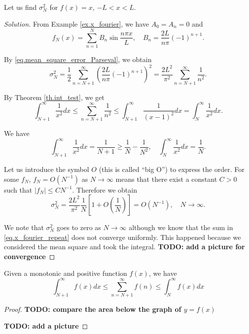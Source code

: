 \begin{example}[]
Let us find $\sigma_N^2$ for $f(x)=x$, $-L<x<L$. 
\end{example}
\begin{proof}[Solution]
From Example \ref{ex.x_fourier}, we have $A_0=A_n=0$ and
\begin{equation}\label{eq.x_fourier_repeat}
    f_N(x)=\sum_{n=1}^N B_n \sin \frac{n \pi x}{L}, \quad B_n=\frac{2 L}{n \pi}(-1)^{n+1} .
\end{equation}

By \eqref{eq.mean_square_error_Parseval}, we obtain
$$
\sigma_N^2=\frac{1}{2} \sum_{n=N+1}^{\infty}\left(\frac{2 L}{n \pi}(-1)^{n+1}\right)^2=\frac{2 L^2}{\pi^2} \sum_{n=N+1}^{\infty} \frac{1}{n^2} .
$$

By Theorem \ref{th.int_test}, we get
$$
\int_{N+1}^{\infty} \frac{1}{x^2} d x \leq \sum_{n=N+1}^{\infty} \frac{1}{n^2} \leq \int_{N+1}^{\infty} \frac{1}{(x-1)^2} d x=\int_N^{\infty} \frac{1}{x^2} d x .
$$

We have
$$
\int_{N+1}^{\infty} \frac{1}{x^2} d x=\frac{1}{N+1} \ge \frac{1}{N} - \frac{1}{N^2}, \quad \int_N^{\infty} \frac{1}{x^2} d x=\frac{1}{N} .
$$

Let us introduce the symbol $O$ (this is called ``big O'') to express the order. For some $f_N$, $f_N=O\left(N^{-1}\right)$ as $N \rightarrow \infty$ means that there exist a constant $C>0$ such that $\left|f_N\right| \leq C N^{-1}$. Therefore we obtain
\begin{equation}\label{eq.x_fourier_mse_converge}
    \sigma_N^2=\frac{2 L^2}{\pi^2} \frac{1}{N}\left[1+O\left(\frac{1}{N}\right)\right]=O\left(N^{-1}\right), \quad N \rightarrow \infty .
\end{equation}

We note that $\sigma_N^2$ goes to zero as $N \rightarrow \infty$ although we know that the sum in \eqref{eq.x_fourier_repeat} does not converge uniformly. This happened because we considered the mean square and took the integral. \textbf{TODO: add a picture for convergence}
\end{proof}

\begin{theorem}\label{th.int_test}
    Given a monotonic and positive function $f(x)$, we have 
    \begin{equation}\label{eq.integral_test}
        \int^{\infty}_{N+1} f(x) dx \le \sum_{n = N+1}^{\infty} f(n)\le \int^{\infty}_{N} f(x) dx
    \end{equation}    
\end{theorem}
\begin{proof}
    \textbf{TODO: compare the area below the graph of $y = f(x)$}

    \textbf{TODO: add a picture}
\end{proof}

